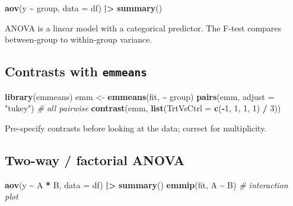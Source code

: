 \documentclass[
]{article}
\newenvironment{Shaded}{\begin{snugshade}}{\end{snugshade}}
\newcommand{\AttributeTok}[1]{\textcolor[rgb]{0.13,0.29,0.53}{#1}}
\newcommand{\CommentTok}[1]{\textcolor[rgb]{0.56,0.35,0.01}{\textit{#1}}}
\newcommand{\DecValTok}[1]{\textcolor[rgb]{0.00,0.00,0.81}{#1}}
\newcommand{\FunctionTok}[1]{\textcolor[rgb]{0.13,0.29,0.53}{\textbf{#1}}}
\newcommand{\NormalTok}[1]{#1}
\newcommand{\OtherTok}[1]{\textcolor[rgb]{0.56,0.35,0.01}{#1}}
\newcommand{\SpecialCharTok}[1]{\textcolor[rgb]{0.81,0.36,0.00}{\textbf{#1}}}
\newcommand{\StringTok}[1]{\textcolor[rgb]{0.31,0.60,0.02}{#1}}
\begin{document}
\begin{Shaded}
\begin{Highlighting}[]
\FunctionTok{aov}\NormalTok{(y }\SpecialCharTok{\textasciitilde{}}\NormalTok{ group, }\AttributeTok{data =}\NormalTok{ df) }\SpecialCharTok{|\textgreater{}} \FunctionTok{summary}\NormalTok{()}
\end{Highlighting}
\end{Shaded}

ANOVA is a linear model with a categorical predictor. The F-test
compares between-group to within-group variance.

\subsection{\texorpdfstring{Contrasts with
\texttt{emmeans}}{Contrasts with emmeans}}\label{contrasts-with-emmeans}

\begin{Shaded}
\begin{Highlighting}[]
\FunctionTok{library}\NormalTok{(emmeans)}
\NormalTok{emm }\OtherTok{\textless{}{-}} \FunctionTok{emmeans}\NormalTok{(fit, }\SpecialCharTok{\textasciitilde{}}\NormalTok{ group)}
\FunctionTok{pairs}\NormalTok{(emm, }\AttributeTok{adjust =} \StringTok{"tukey"}\NormalTok{)   }\CommentTok{\# all pairwise}
\FunctionTok{contrast}\NormalTok{(emm, }\FunctionTok{list}\NormalTok{(}\AttributeTok{TrtVsCtrl =} \FunctionTok{c}\NormalTok{(}\SpecialCharTok{{-}}\DecValTok{1}\NormalTok{, }\DecValTok{1}\NormalTok{, }\DecValTok{1}\NormalTok{, }\DecValTok{1}\NormalTok{) }\SpecialCharTok{/} \DecValTok{3}\NormalTok{))}
\end{Highlighting}
\end{Shaded}

Pre-specify contrasts before looking at the data; correct for
multiplicity.

\subsection{Two-way / factorial ANOVA}\label{two-way-factorial-anova}

\begin{Shaded}
\begin{Highlighting}[]
\FunctionTok{aov}\NormalTok{(y }\SpecialCharTok{\textasciitilde{}}\NormalTok{ A }\SpecialCharTok{*}\NormalTok{ B, }\AttributeTok{data =}\NormalTok{ df) }\SpecialCharTok{|\textgreater{}} \FunctionTok{summary}\NormalTok{()}
\FunctionTok{emmip}\NormalTok{(fit, A }\SpecialCharTok{\textasciitilde{}}\NormalTok{ B)   }\CommentTok{\# interaction plot}
\end{Highlighting}
\end{Shaded}
\end{document}

